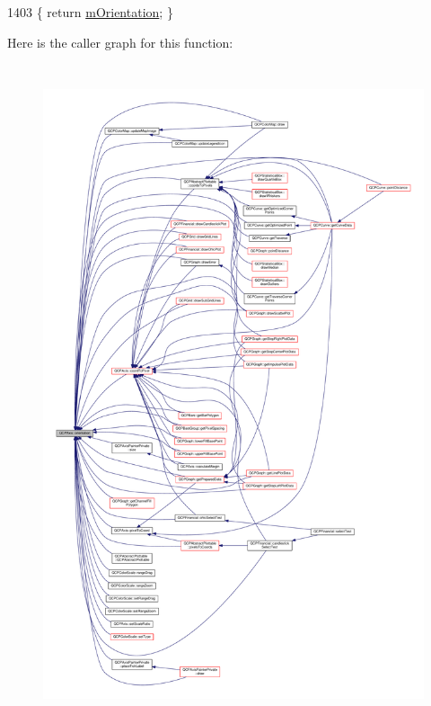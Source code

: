 \begin{DoxyCode}
1403 \{ \textcolor{keywordflow}{return} \hyperlink{class_q_c_p_axis_a048e1792fa86f4f86df55200b3f0be36}{mOrientation}; \}
\end{DoxyCode}


Here is the caller graph for this function\+:\nopagebreak
\begin{figure}[H]
\begin{center}
\leavevmode
\includegraphics[height=550pt]{class_q_c_p_axis_a57483f2f60145ddc9e63f3af53959265_icgraph}
\end{center}
\end{figure}


\hypertarget{class_q_c_p_axis_a9a68b3e45f1b1e33d4d807822342516c}{}
